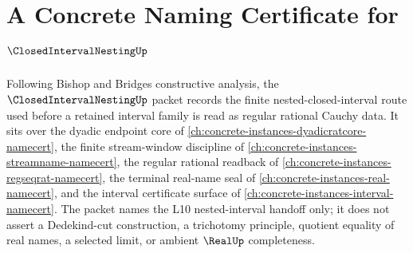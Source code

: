 \chapter{A Concrete Naming Certificate for $\ClosedIntervalNestingUp$}
\label{ch:concrete-instances-closed-interval-nesting-namecert}

Following Bishop and Bridges constructive analysis, the $\ClosedIntervalNestingUp$ packet records the finite nested-closed-interval route used before a retained interval family is read as regular rational Cauchy data. It sits over the dyadic endpoint core of \autoref{ch:concrete-instances-dyadicratcore-namecert}, the finite stream-window discipline of \autoref{ch:concrete-instances-streamname-namecert}, the regular rational readback of \autoref{ch:concrete-instances-regseqrat-namecert}, the terminal real-name seal of \autoref{ch:concrete-instances-real-namecert}, and the interval certificate surface of \autoref{ch:concrete-instances-interval-namecert}. The packet names the L10 nested-interval handoff only; it does not assert a Dedekind-cut construction, a trichotomy principle, quotient equality of real names, a selected limit, or ambient $\RealUp$ completeness.

